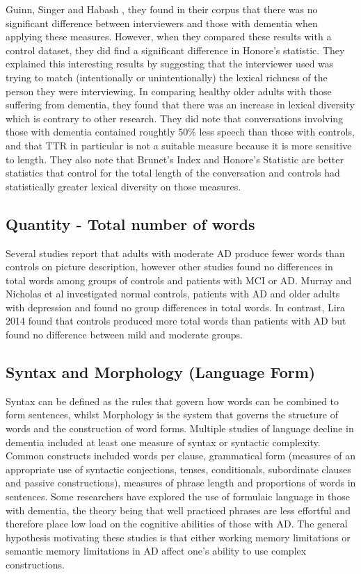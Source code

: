 \documentclass[10pt, letterpaper, twoside, openany]{thesis}
\begin{document}
Guinn, Singer and Habash \cite{Guinn2015}, they found in their corpus that there was no significant difference between interviewers and those with dementia when applying these measures. However, when they compared these results with a control dataset, they did find a significant difference in Honore's statistic. They explained this interesting results by suggesting that the interviewer used was trying to match (intentionally or unintentionally) the lexical richness of the person they were interviewing. In comparing healthy older adults with those suffering from dementia, they found that there was an increase in lexical diversity which is contrary to other research. They did note that conversations involving those with dementia contained roughtly 50\% less speech than those with controls, and that TTR in particular is not a suitable measure because it is more sensitive to length. They also note that Brunet's Index and Honore's Statistic are better statistics that control for the total length of the conversation and controls had statistically greater lexical diversity on those measures. 


\subsection{Quantity - Total number of words}
Several studies report that adults with moderate AD produce fewer words than controls on picture description, however other studies found no differences in total words among groups of controls and patients with MCI or AD. Murray and Nicholas et al investigated normal controls, patients with AD and older adults with depression and found no group differences in total words. In contrast, Lira 2014 found that controls produced more total words than patients with AD but found no difference between mild and moderate groups. \newline
\par
\subsection{Syntax and Morphology (Language Form)}
Syntax can be defined as the rules that govern how words can be combined to form sentences, whilst Morphology is the system that governs the structure of words and the construction of word forms. Multiple studies of language decline in dementia included at least one measure of syntax or syntactic complexity. Common constructs included words per clause, grammatical form (measures of an appropriate use of syntactic conjections, tenses, conditionals, subordinate clauses and passive constructions), measures of phrase length and proportions of words in sentences. Some researchers have explored the use of formulaic language in those with dementia, the theory being that well practiced phrases are less effortful and therefore place low load on the cognitive abilities of those with AD. The general hypothesis motivating these studies is that either working memory limitations or semantic memory limitations in AD affect one's ability to use complex constructions.
\par
\end{document}
